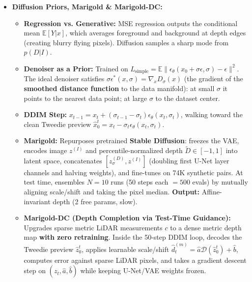 \documentclass[11pt,a4paper]{article}
\theoremstyle{definition}
\theoremstyle{plain}
\theoremstyle{remark}
\begin{document}
\begin{itemize}
\begin{itemize}
        \item \textbf{Self-Supervised Stereo:} Trains without depth labels using photometric warp loss $\mathcal{L}_{\text{photo}} = \|\tilde{I}_L - I_L\|$ via \textbf{backward warping} $\tilde{I}_L(u,v) = I_R(u - d(u,v), v)$ (avoids holes/collisions of forward warping). \textbf{Blind spots:} Textureless regions (image gradient $I_R' = 0 \Rightarrow \frac{\partial \mathcal{L}}{\partial d} = 0$) and occlusions.
    \end{itemize}
    \item \textbf{Diffusion Priors, Marigold \& Marigold-DC:}
    \begin{itemize}
        \item \textbf{Regression vs. Generative:} MSE regression outputs the conditional mean $\mathbb{E}[Y|x]$, which averages foreground and background at depth edges (creating blurry flying pixels). Diffusion samples a sharp mode from $p(D|I)$.
        \item \textbf{Denoiser as a Prior:} Trained on $L_{\text{simple}} = \mathbb{E}\|\epsilon_\theta(x_0 + \sigma\epsilon, \sigma) - \epsilon\|^2$. The ideal denoiser satisfies $\sigma\epsilon^*(x, \sigma) = \nabla_x D_\sigma(x)$ (the gradient of the \textbf{smoothed distance function} to the data manifold): at small $\sigma$ it points to the nearest data point; at large $\sigma$ to the dataset center.
        \item \textbf{DDIM Step:} $x_{t-1} = x_t + (\sigma_{t-1} - \sigma_t)\epsilon_\theta(x_t, \sigma_t)$, walking toward the clean Tweedie preview $\hat{x}_0^t = x_t - \sigma_t\epsilon_\theta(x_t, \sigma_t)$.
        \item \textbf{Marigold:} Repurposes pretrained \textbf{Stable Diffusion}: freezes the VAE, encodes image $z^{(I)}$ and percentile-normalized depth $\tilde{D} \in [-1,1]$ into latent space, concatenates $[z_\sigma^{(D)}, z^{(I)}]$ (doubling first U-Net layer channels and halving weights), and fine-tunes on 74K synthetic pairs. At test time, ensembles $N=10$ runs (50 steps each $= 500$ evals) by mutually aligning scale/shift and taking the pixel median. \textbf{Output:} Affine-invariant depth (2 free params, slow).
        \item \textbf{Marigold-DC (Depth Completion via Test-Time Guidance):} Upgrades sparse metric LiDAR measurements $c$ to a dense metric depth map \textbf{with zero retraining}. Inside the 50-step DDIM loop, decodes the Tweedie preview $\hat{z}_0^t$, applies learnable scale/shift $\hat{d}_t^{(m)} = \hat{a}\mathcal{D}(\hat{z}_0^t) + \hat{b}$, computes error against sparse LiDAR pixels, and takes a gradient descent step on $(z_t, \hat{a}, \hat{b})$ while keeping U-Net/VAE weights frozen.
    \end{itemize}
\end{itemize}
\end{document}
